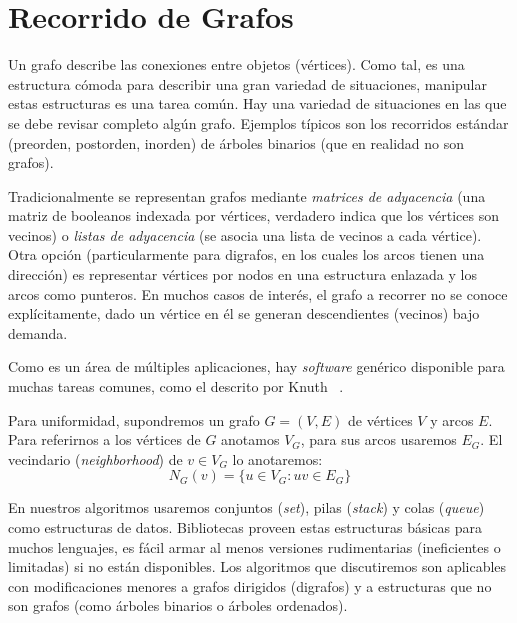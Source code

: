 

\chapter{Recorrido de Grafos}
\label{cha:recorrido-grafos}

  Un grafo describe las conexiones entre objetos
  (vértices).
  Como tal,
  es una estructura cómoda para describir una gran variedad de situaciones,
  manipular estas estructuras es una tarea común.
  Hay una variedad de situaciones en las que se debe revisar completo
  algún grafo.
  Ejemplos típicos son los recorridos estándar
  (preorden, postorden, inorden)
  de árboles binarios
  (que en realidad no son grafos).

  Tradicionalmente se representan grafos
  mediante \emph{matrices de adyacencia}
  (una matriz de booleanos indexada por vértices,
   verdadero indica que los vértices son vecinos)
  o \emph{listas de adyacencia}
  (se asocia una lista de vecinos a cada vértice).
  Otra opción
  (particularmente para digrafos,
   en los cuales los arcos tienen una dirección)
  es representar vértices por nodos en una estructura enlazada
  y los arcos como punteros.
  En muchos casos de interés,
  el grafo a recorrer no se conoce explícitamente,
  dado un vértice en él se generan descendientes (vecinos) bajo demanda.

  Como es un área de múltiples aplicaciones,
  hay \emph{\foreignlanguage{english}{software}} genérico disponible
  para muchas tareas comunes,
  como el descrito por Knuth~%
    \cite{knuth09:_sgb}.

  Para uniformidad,
  supondremos un grafo \(G = (V, E)\)
  de vértices \(V\) y arcos \(E\).
  Para referirnos a los vértices de \(G\) anotamos \(V_G\),
  para sus arcos usaremos \(E_G\).
  El vecindario
  (\emph{\foreignlanguage{english}{neighborhood}})
  de \(v \in V_G\) lo anotaremos:
  \begin{equation*}
    N_G(v)
      = \{ u \in V_G \colon u v \in E_G \}
  \end{equation*}

  En nuestros algoritmos
  usaremos conjuntos (\emph{\foreignlanguage{english}{set}}),
  pilas (\emph{\foreignlanguage{english}{stack}}) y
  colas (\emph{\foreignlanguage{english}{queue}})
  como estructuras de datos.
  Bibliotecas proveen estas estructuras básicas para muchos lenguajes,
  es fácil armar al menos versiones rudimentarias
  (ineficientes o limitadas)
  si no están disponibles.
  Los algoritmos que discutiremos
  son aplicables con modificaciones menores a grafos dirigidos
  (digrafos)
  y a estructuras que no son grafos
  (como árboles binarios o árboles ordenados).

